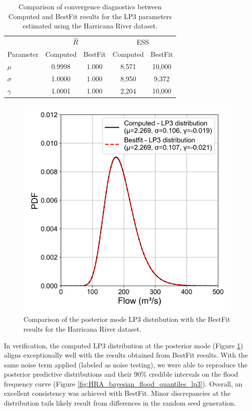 \renewcommand{\arraystretch}{1.2}
\begin{table}[H]
\centering
\caption{Comparison of convergence diagnostics between Computed and BestFit results for the LP3 parameters estimated using the Harricana River dataset.}
\begin{tabular}{l c c c c}
\hline
 & \multicolumn{2}{c}{$\hat{R}$} & \multicolumn{2}{c}{ESS} \\ 
Parameter & Computed & BestFit & Computed & BestFit \\ \hline
$\mu$ & 0.9998 & 1.000 & 8,571 & 10,000 \\
$\sigma$ & 1.0000 & 1.000 & 8,950 & 9,372 \\
$\gamma$ & 1.0001 & 1.000 & 2,204 & 10,000 \\
\hline
\end{tabular}
\label{table:HRA_Rhat}
\end{table}

\begin{figure}[H]
    \centering
    \includegraphics[width=1\linewidth]{_plots/HRA_LP3_comparison.png}
    \caption{Comparison of the posterior mode LP3 distribution with the BestFit results for the Harricana River dataset. }
    \label{fig:HRA_LP3_comparison}
\end{figure}

In verification, the computed LP3 distribution at the posterior mode (Figure \ref{fig:HRA_LP3_comparison}) aligns exceptionally well with the results obtained from BestFit results. With the same noise term applied (labeled as noise testing), we were able to reproduce the posterior predictive distributions and their 90\% credible intervals on the flood frequency curve (Figure \ref{fig:HRA_bayesian_flood_quantiles_lp3}). Overall, an excellent consistency was achieved with BestFit. Minor discrepancies at the distribution tails likely result from differences in the random seed generation.

